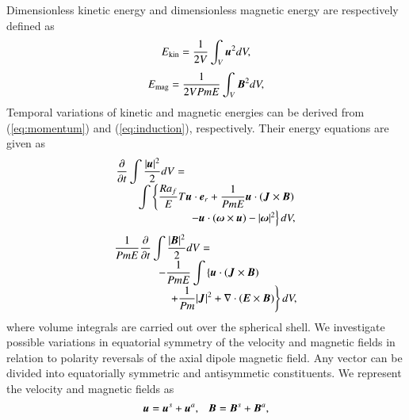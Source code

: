 Dimensionless kinetic energy and dimensionless magnetic energy are respectively defined as
%
\begin{equation}
E_{\rm kin} = \frac{1}{2 V}
  \int_V \mbox{\boldmath$u$}^2 d V ,
\label{eq:Ekin}
\end{equation}
%
\begin{equation}
E_{\rm mag} = \frac{1}{2 V Pm E}
  \int_V \mbox{\boldmath$B$}^2 d V ,
\label{eq:Emag}
\end{equation}
%
Temporal variations of kinetic and magnetic energies can be derived from (\ref{eq:momentum}) and (\ref{eq:induction}), respectively.
Their energy equations are given as
%
\begin{equation}
\begin{array}{l}
\displaystyle
\frac{\partial}{\partial t}
 \int \frac{|\bvec{u}|^2}{2} d V =
\nonumber \\
\displaystyle
\hfill
\hspace*{2em}
\int \left\{
      \frac{Ra_f}{E}T \bvec{u}\cdot \bvec{e}_r
    + \frac{1}{Pm E} \bvec{u} \cdot
                     (\bvec{J} \times \bvec{B})
      \right.
\nonumber \\
\hfill
      \left.
    - \bvec{u} \cdot (\bvec{\omega}\times\bvec{u})
    - |\bvec{\omega}|^2 
      \right\} d V,
\end{array}
\label{eq:energy_u}
\end{equation}
%
\begin{equation}
\begin{array}{l}
\displaystyle
\frac{1}{Pm E}\frac{\partial}{\partial t}
 \int \frac{|\mbox{\boldmath$B$}|^2}{2} d V =
\nonumber \\
\hspace*{4em}
\displaystyle
- \frac{1}{Pm E}\int \left\{
      \mbox{\boldmath$u$} \cdot ( \mbox{\boldmath$J$} \times \mbox{\boldmath$B$} )
    \right.
\nonumber \\
\hspace{5em}
\displaystyle
    \left.
    + \frac{1}{Pm} |\mbox{\boldmath$J$}|^2
    + \nabla \cdot ( \mbox{\boldmath$E$} \times \mbox{\boldmath$B$} ) 
      \right\} d V,
\end{array}
\label{eq:energy_B}
\end{equation}
%
where volume integrals are carried out over the spherical shell.
We investigate possible variations in equatorial symmetry of the velocity and magnetic fields in relation to polarity reversals of the axial dipole magnetic field.
Any vector can be divided into equatorially symmetric and antisymmetic constituents.
We represent the velocity and magnetic fields as
%
\begin{equation}
\mbox{\boldmath$u$} = \mbox{\boldmath$u$}^s + \mbox{\boldmath$u$}^a, ~~~
\mbox{\boldmath$B$} = \mbox{\boldmath$B$}^s + \mbox{\boldmath$B$}^a,
\label{eq:eqas}
\end{equation}
